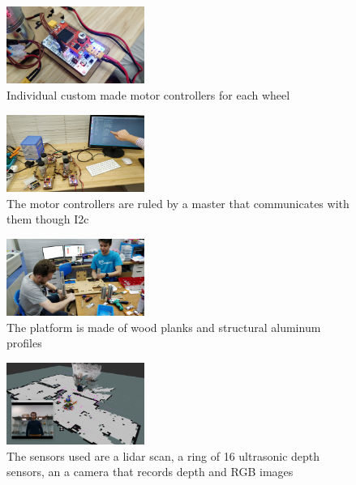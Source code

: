 \begin{center}
  \setlength\intextsep{0pt}
  \begin{figure}
    \centering
    \includegraphics[width=0.4\textwidth]{images/cuaga_force_on.jpg}
    \caption{Individual custom made motor controllers for each wheel}
    \label{fig:cuaga_force_on}
  \end{figure}

  \setlength\intextsep{0pt}
  \begin{figure}
    \centering
    \includegraphics[width=0.4\textwidth]{images/motors_and_screen.jpg}
    \caption{The motor controllers are ruled by a master that communicates with them though I2c}
    \label{fig:motors_and_screen}
  \end{figure}

  \setlength\intextsep{0pt}
  \begin{figure}
    \centering
    \includegraphics[width=0.4\textwidth]{images/ensambling_the_motor_platform.jpg}
    \caption{The platform is made of wood planks and structural aluminum profiles}
    \label{fig:ensambling_the_motor_platform}
  \end{figure}

  \setlength\intextsep{0pt}
  \begin{figure}
    \centering
    \includegraphics[width=0.4\textwidth]{images/rviz_camera.png}
    \caption{The sensors used are a lidar scan, a ring of 16 ultrasonic depth sensors, an a camera that records depth and RGB images}
    \label{fig:rviz_camera}
  \end{figure}


\end{center}
